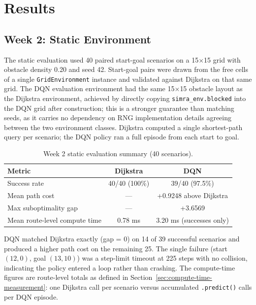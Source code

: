 \section{Results}
\label{sec:results}

\subsection{Week 2: Static Environment}

The static evaluation used 40 paired start-goal scenarios on a 15$\times$15 grid with obstacle density 0.20 and seed 42. Start-goal pairs were drawn from the free cells of a single \texttt{GridEnvironment} instance and validated against Dijkstra on that same grid. The DQN evaluation environment had the same 15$\times$15 obstacle layout as the Dijkstra environment, achieved by directly copying \texttt{simra\_env.blocked} into the DQN grid after construction; this is a stronger guarantee than matching seeds, as it carries no dependency on RNG implementation details agreeing between the two environment classes. Dijkstra computed a single shortest-path query per scenario; the DQN policy ran a full episode from each start to goal.

\begin{table}[h]
\centering
\small
\caption{Week 2 static evaluation summary (40 scenarios).}
\label{tab:static-summary}
\begin{tabular}{lcc}
\hline
\textbf{Metric} & \textbf{Dijkstra} & \textbf{DQN} \\
\hline
Success rate & 40/40 (100\%) & 39/40 (97.5\%) \\
Mean path cost & --- & +0.9248 above Dijkstra \\
Max suboptimality gap & --- & +3.6569 \\
Mean route-level compute time & 0.78 ms & 3.20 ms (successes only) \\
\hline
\end{tabular}
\end{table}

DQN matched Dijkstra exactly (gap = 0) on 14 of 39 successful scenarios and produced a higher path cost on the remaining 25. The single failure (start $(12,0)$, goal $(13,10)$) was a step-limit timeout at 225 steps with no collision, indicating the policy entered a loop rather than crashing. The compute-time figures are route-level totals as defined in Section~\ref{sec:compute-time-measurement}: one Dijkstra call per scenario versus accumulated \texttt{.predict()} calls per DQN episode.

